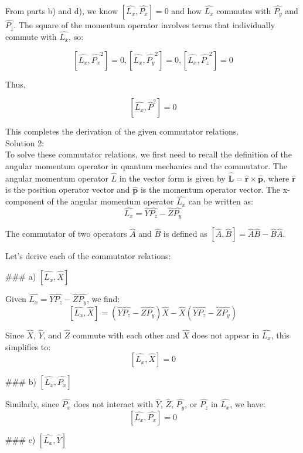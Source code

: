 \documentclass[a4paper,11pt]{article}
\begin{document}
From parts b) and d), we know \( \left[ \hat{L_{x}}, \hat{P_{x}} \right] = 0 \) and how \( \hat{L_{x}} \) commutes with \( \hat{P_{y}} \) and \( \hat{P_{z}} \). The square of the momentum operator involves terms that individually commute with \( \hat{L_{x}} \), so:

\[ \left[ \hat{L_{x}}, \hat{P_{x}}^2 \right] = 0, \left[ \hat{L_{x}}, \hat{P_{y}}^2 \right] = 0, \left[ \hat{L_{x}}, \hat{P_{z}}^2 \right] = 0 \]

Thus,

\[ \left[ \hat{L_{x}}, \hat{P}^{2} \right] = 0 \]

This completes the derivation of the given commutator relations. \\

Solution 2: \\
To solve these commutator relations, we first need to recall the definition of the angular momentum operator in quantum mechanics and the commutator. The angular momentum operator \( \hat{L} \) in the vector form is given by \( \hat{\mathbf{L}} = \hat{\mathbf{r}} \times \hat{\mathbf{p}} \), where \( \hat{\mathbf{r}} \) is the position operator vector and \( \hat{\mathbf{p}} \) is the momentum operator vector. The x-component of the angular momentum operator \( \hat{L_{x}} \) can be written as:
\[ \hat{L_{x}} = \hat{Y}\hat{P_{z}} - \hat{Z}\hat{P_{y}} \]

The commutator of two operators \( \hat{A} \) and \( \hat{B} \) is defined as \( [ \hat{A}, \hat{B} ] = \hat{A}\hat{B} - \hat{B}\hat{A} \).

Let's derive each of the commutator relations:

### a) \( [ \hat{L_{x}}, \hat{X} ] \)

Given \( \hat{L_{x}} = \hat{Y}\hat{P_{z}} - \hat{Z}\hat{P_{y}} \), we find:
\[ [ \hat{L_{x}}, \hat{X} ] = (\hat{Y}\hat{P_{z}} - \hat{Z}\hat{P_{y}})\hat{X} - \hat{X}(\hat{Y}\hat{P_{z}} - \hat{Z}\hat{P_{y}}) \]

Since \( \hat{X} \), \( \hat{Y} \), and \( \hat{Z} \) commute with each other and \( \hat{X} \) does not appear in \( \hat{L_{x}} \), this simplifies to:
\[ [ \hat{L_{x}}, \hat{X} ] = 0 \]

### b) \( [ \hat{L_{x}}, \hat{P_{x}} ] \)

Similarly, since \( \hat{P_{x}} \) does not interact with \( \hat{Y} \), \( \hat{Z} \), \( \hat{P_{y}} \), or \( \hat{P_{z}} \) in \( \hat{L_{x}} \), we have:
\[ [ \hat{L_{x}}, \hat{P_{x}} ] = 0 \]

### c) \( [ \hat{L_{x}}, \hat{Y} ] \)
\end{document}
